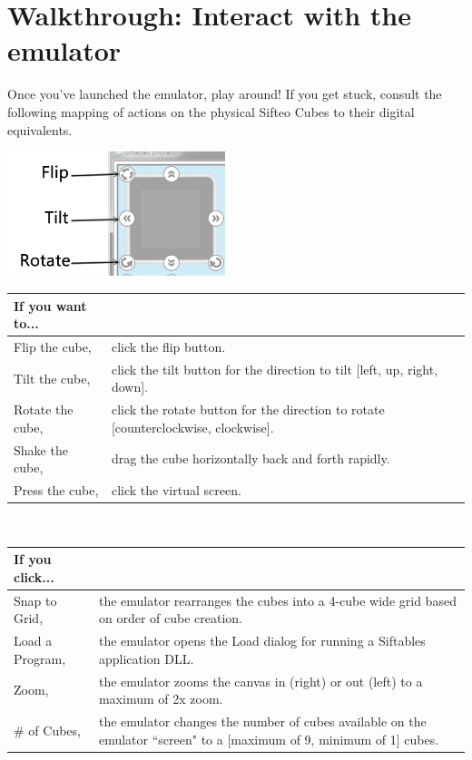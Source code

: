 \documentclass[12pt]{article}
\begin{document}
\section{Walkthrough: Interact with the emulator}
Once you've launched the emulator, play around! If you get stuck, consult the following mapping of actions on the physical Sifteo Cubes to their digital equivalents.

\begin{center}\includegraphics[width=2.5in]{interact}\end{center}
\begin{center}
	\begin{tabular}{ | p{1.5in} | p{4.5in} | }
	\hline
	\textbf{If you want to...}   \\\hline
	Flip the cube,  & click the flip button. \\\hline
	Tilt the cube, & click the tilt button for the direction to tilt [left, up, right, down]. \\\hline
	Rotate the cube, & click the rotate button for the direction to rotate [counterclockwise, clockwise]. \\\hline
	Shake the cube, & drag the cube horizontally back and forth rapidly. \\\hline
	Press the cube, & click the virtual screen. \\\hline
	\end{tabular}\\

	\begin{tabular}{ | p{1.5in} | p{4.5in} | }
	\hline
	\textbf{If you click...}   \\\hline
	Snap to Grid, & the emulator rearranges the cubes into a 4-cube wide grid based on order of cube creation. \\\hline
	Load a Program, & the emulator opens the Load dialog for running a Siftables application DLL. \\\hline
	Zoom,  & the emulator zooms the canvas in (right) or out (left) to a maximum of 2x zoom. \\\hline
	\# of Cubes, & the emulator changes the number of cubes available on the emulator ``screen" to a [maximum of 9, minimum of 1] cubes. \\\hline
	\end{tabular}

\end{center}
\end{document}
